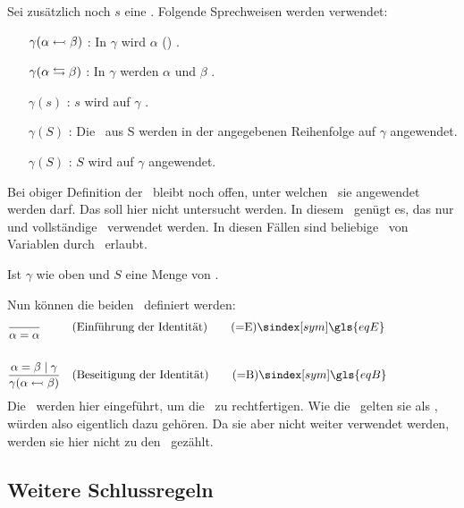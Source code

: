 {Sei zusätzlich noch $s$ eine \Substitution.
Folgende Sprechweisen werden verwendet:
\begin{itemize}
	\renewcommand*{\itemindent}{1,5cm}
	\renewcommand*{\labelsep}{5pt}
	\item [$\gamma(\alpha \leftarrowtail \beta)$ :] In $\gamma$ wird $\alpha$ () .
	\item [$\gamma(\alpha \leftrightarrows \beta)$ :] In $\gamma$ werden $\alpha$ und $\beta$ .
	\item [$\gamma(s)$ :] $s$ wird auf $\gamma$ .
	\item [$\gamma(S)$ :] Die \Substitutionen\ aus S werden in der angegebenen Reihenfolge auf $\gamma$ angewendet.
	\item [$\gamma(S)$ :] $S$ wird auf $\gamma$ angewendet.
\end{itemize}
%
Bei obiger Definition der \Substitution\ bleibt noch offen, unter welchen \Voraussetzungen\ sie angewendet werden darf. Das soll hier nicht untersucht werden. In diesem \sectionname\ genügt es, das nur  und vollständige \Substitution\ verwendet werden.
In diesen Fällen sind beliebige \Substitutionen\ von Variablen durch \Formeln\ erlaubt.

Ist $\gamma$ wie oben und $S$ eine Menge von \Substitutionen.

Nun können die beiden \Identitaetsregeln\ definiert werden:
\begin{align}
	& \frac{}{\alpha\eq\alpha}
	& & (\text{Einführung der Identität})
	\tag{\tageqE} \sym{\gls{eqE}} \label{def:eqE}
	\\\\
	& \frac{\alpha\eq\beta \srand \gamma}{\gamma(\alpha\subst\beta)}
	& & (\text{Beseitigung der Identität})
	\tag{\tageqB} \sym{\gls{eqB}} \label{def:eqB}
	\formulatoleft
\end{align}
%
Die \Identitaetsregeln\ werden hier eingeführt, um die \Substitution\ zu rechtfertigen.
Wie die \Basisregeln\ gelten sie als \Axiome, würden also eigentlich dazu gehören.
Da sie aber nicht weiter verwendet werden, werden sie hier nicht zu den \Basisregeln\ gezählt.

\subsection{Weitere Schlussregeln}%
\label{sub:weitereSchlussregeln}

}
